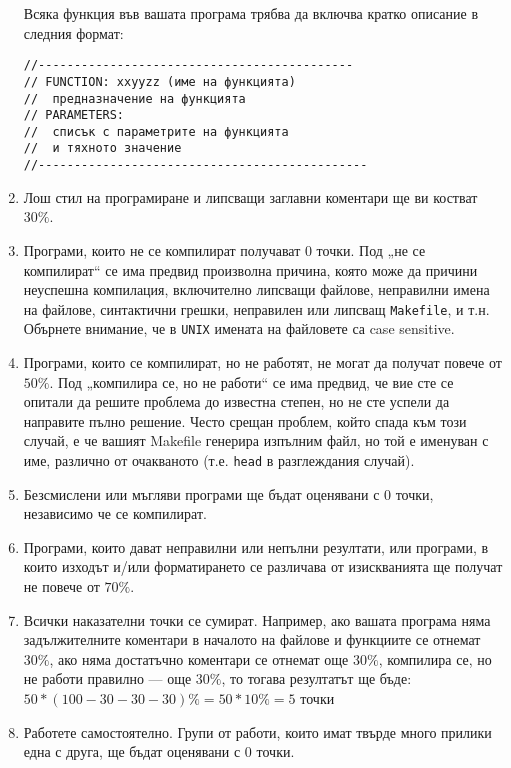 \documentclass[a4paper,10pt]{article}
\begin{document}
\begin{enumerate}
				Всяка функция във вашата програма трябва да включва кратко описание в следния формат:

				\begin{verbatim}
//--------------------------------------------
// FUNCTION: xxyyzz (име на функцията)
// 	предназначение на функцията
// PARAMETERS:
// 	списък с параметрите на функцията
// 	и тяхното значение
//----------------------------------------------
				\end{verbatim}

			\item Лош стил на програмиране и липсващи заглавни коментари ще ви костват $30\%$.
			
			\item Програми, които не се компилират получават 0 точки. Под „не се компилират“ се има предвид произволна причина, 
			която може да причини неуспешна компилация, включително липсващи файлове, неправилни имена на файлове, синтактични 
			грешки, неправилен или липсващ  \verb|Makefile|, и т.н. Обърнете внимание, че в \verb|UNIX| имената на файловете 
			са case sensitive.
			
			\item Програми, които се компилират, но не работят, не могат да получат повече от $50\%$. Под „компилира се, но не 
			работи“ се има предвид, че вие сте се опитали да решите проблема до известна степен, но не сте успели да направите 
			пълно решение. Често срещан проблем, който спада към този случай, е че вашият  Makefile генерира изпълним файл, но 
			той е именуван с име, различно от очакваното (т.е. \verb|head| в разглеждания случай).
			
			\item Безсмислени или мъгляви програми ще бъдат оценявани с 0 точки, независимо че се компилират.
			
			\item Програми, които дават неправилни или непълни резултати, или програми, в които изходът и/или форматирането се 
			различава от изискванията ще получат не повече от $70\%$.
			
			\item Всички наказателни точки се сумират. Например, ако вашата програма няма задължителните коментари в началото 
			на файлове и функциите се отнемат $30\%$, ако няма достатъчно коментари се отнемат още $30\%$, компилира се, но не 
			работи правилно — още $30\%$, то тогава резултатът ще бъде: $50*(100-30-30-30)\%= 50*10\%= 5$ точки
			
			\item Работете самостоятелно. Групи от работи, които имат твърде много прилики една с друга, ще бъдат оценявани с 				0 точки.
			
		\end{enumerate}
\end{document}
